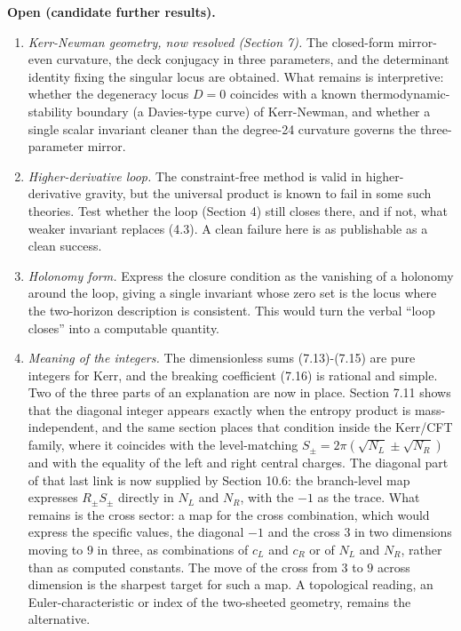 \documentclass[11pt]{article}
\begin{document}
\textbf{Open (candidate further results).}

\begin{enumerate}
\item \emph{Kerr-Newman geometry, now resolved (Section 7).} The closed-form mirror-even curvature, the deck conjugacy in three parameters, and the determinant identity fixing the singular locus are obtained. What remains is interpretive: whether the degeneracy locus $D = 0$ coincides with a known thermodynamic-stability boundary (a Davies-type curve) of Kerr-Newman, and whether a single scalar invariant cleaner than the degree-24 curvature governs the three-parameter mirror.
\item \emph{Higher-derivative loop.} The constraint-free method is valid in higher-derivative gravity, but the universal product is known to fail in some such theories. Test whether the loop (Section 4) still closes there, and if not, what weaker invariant replaces (4.3). A clean failure here is as publishable as a clean success.
\item \emph{Holonomy form.} Express the closure condition as the vanishing of a holonomy around the loop, giving a single invariant whose zero set is the locus where the two-horizon description is consistent. This would turn the verbal ``loop closes'' into a computable quantity.
\item \emph{Meaning of the integers.} The dimensionless sums (7.13)-(7.15) are pure integers for Kerr, and the breaking coefficient (7.16) is rational and simple. Two of the three parts of an explanation are now in place. Section 7.11 shows that the diagonal integer appears exactly when the entropy product is mass-independent, and the same section places that condition inside the Kerr/CFT family, where it coincides with the level-matching $S_\pm = 2\pi(\sqrt{N_L} \pm \sqrt{N_R})$ and with the equality of the left and right central charges. The diagonal part of that last link is now supplied by Section 10.6: the branch-level map expresses $R_\pm S_\pm$ directly in $N_L$ and $N_R$, with the $-1$ as the trace. What remains is the cross sector: a map for the cross combination, which would express the specific values, the diagonal $-1$ and the cross $3$ in two dimensions moving to $9$ in three, as combinations of $c_L$ and $c_R$ or of $N_L$ and $N_R$, rather than as computed constants. The move of the cross from $3$ to $9$ across dimension is the sharpest target for such a map. A topological reading, an Euler-characteristic or index of the two-sheeted geometry, remains the alternative.

\end{enumerate}
\end{document}

